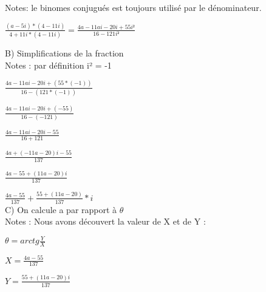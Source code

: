 \vspace{5mm} %

Notes: le binomes conjugués est toujours utilisé par le dénominateur.

\vspace{5mm} %

$
\frac{(a-5i) *(4-11i)}{4+11i * (4-11i)} = \frac{4a-11ai-20i+55i²}{16-121i²}
$

\vspace{10mm} %

B) Simplifications de la fraction \\

Notes : par définition i² = -1

\vspace{5mm} %

$
\frac{4a-11ai-20i+(55*(-1))}{16-(121*(-1))}
$

\vspace{3mm} %

$
\frac{4a-11ai-20i+(-55)}{16-(-121)}
$
\vspace{3mm} %

$
\frac{4a-11ai-20i-55}{16+121}
$

\vspace{3mm} %

$
\frac{4a+(-11a-20)i-55}{137}
$

\vspace{3mm} %

$
\frac{4a-55+(11a-20)i}{137}
$
\vspace{3mm} %

$
\frac{4a-55}{137} + \frac{55+(11a-20)}{137}*i
$\\

\vspace{8mm} %
C) On calcule a par rapport à $\theta$ \\

Notes : Nous avons découvert la valeur de X et de Y : \\
\vspace{3mm} %

$
\theta = arctg{\frac{Y}{X}}
$
\vspace{5mm} %

$
X = \frac{4a-55}{137}
$
\vspace{5mm} %

$
Y= \frac{55+(11a-20)i}{137}
$
\vspace{5mm} %

